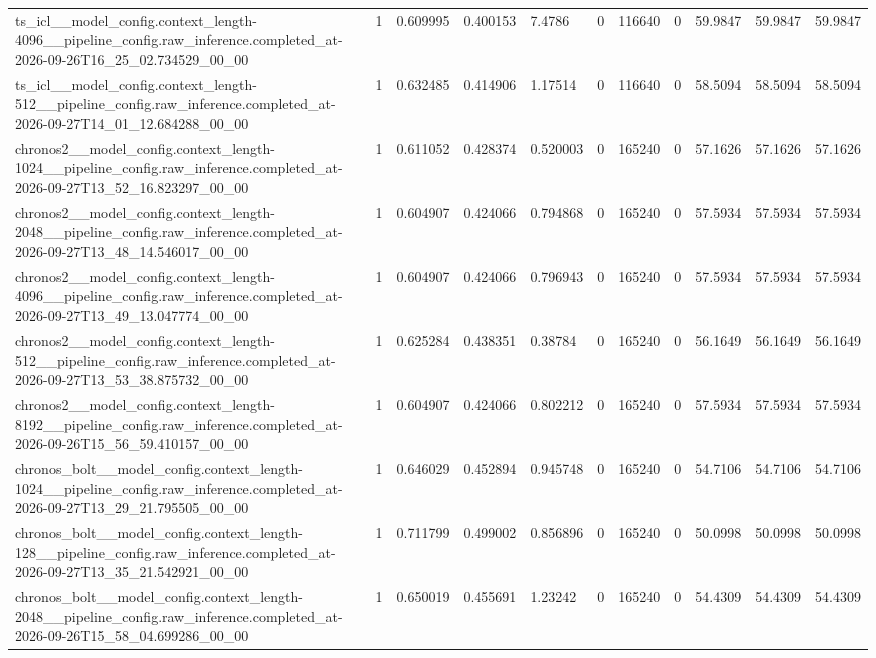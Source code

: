 \begin{tabular}{lllllllllll}
ts\_icl\_\_model\_config.context\_length-4096\_\_pipeline\_config.raw\_inference.completed\_at-2026-09-26T16\_25\_02.734529\_00\_00 & 1 & 0.609995 & 0.400153 & 7.4786 & 0 & 116640 & 0 & 59.9847 & 59.9847 & 59.9847 \\
ts\_icl\_\_model\_config.context\_length-512\_\_pipeline\_config.raw\_inference.completed\_at-2026-09-27T14\_01\_12.684288\_00\_00 & 1 & 0.632485 & 0.414906 & 1.17514 & 0 & 116640 & 0 & 58.5094 & 58.5094 & 58.5094 \\
chronos2\_\_model\_config.context\_length-1024\_\_pipeline\_config.raw\_inference.completed\_at-2026-09-27T13\_52\_16.823297\_00\_00 & 1 & 0.611052 & 0.428374 & 0.520003 & 0 & 165240 & 0 & 57.1626 & 57.1626 & 57.1626 \\
chronos2\_\_model\_config.context\_length-2048\_\_pipeline\_config.raw\_inference.completed\_at-2026-09-27T13\_48\_14.546017\_00\_00 & 1 & 0.604907 & 0.424066 & 0.794868 & 0 & 165240 & 0 & 57.5934 & 57.5934 & 57.5934 \\
chronos2\_\_model\_config.context\_length-4096\_\_pipeline\_config.raw\_inference.completed\_at-2026-09-27T13\_49\_13.047774\_00\_00 & 1 & 0.604907 & 0.424066 & 0.796943 & 0 & 165240 & 0 & 57.5934 & 57.5934 & 57.5934 \\
chronos2\_\_model\_config.context\_length-512\_\_pipeline\_config.raw\_inference.completed\_at-2026-09-27T13\_53\_38.875732\_00\_00 & 1 & 0.625284 & 0.438351 & 0.38784 & 0 & 165240 & 0 & 56.1649 & 56.1649 & 56.1649 \\
chronos2\_\_model\_config.context\_length-8192\_\_pipeline\_config.raw\_inference.completed\_at-2026-09-26T15\_56\_59.410157\_00\_00 & 1 & 0.604907 & 0.424066 & 0.802212 & 0 & 165240 & 0 & 57.5934 & 57.5934 & 57.5934 \\
chronos\_bolt\_\_model\_config.context\_length-1024\_\_pipeline\_config.raw\_inference.completed\_at-2026-09-27T13\_29\_21.795505\_00\_00 & 1 & 0.646029 & 0.452894 & 0.945748 & 0 & 165240 & 0 & 54.7106 & 54.7106 & 54.7106 \\
chronos\_bolt\_\_model\_config.context\_length-128\_\_pipeline\_config.raw\_inference.completed\_at-2026-09-27T13\_35\_21.542921\_00\_00 & 1 & 0.711799 & 0.499002 & 0.856896 & 0 & 165240 & 0 & 50.0998 & 50.0998 & 50.0998 \\
chronos\_bolt\_\_model\_config.context\_length-2048\_\_pipeline\_config.raw\_inference.completed\_at-2026-09-26T15\_58\_04.699286\_00\_00 & 1 & 0.650019 & 0.455691 & 1.23242 & 0 & 165240 & 0 & 54.4309 & 54.4309 & 54.4309 \\

\end{tabular}
